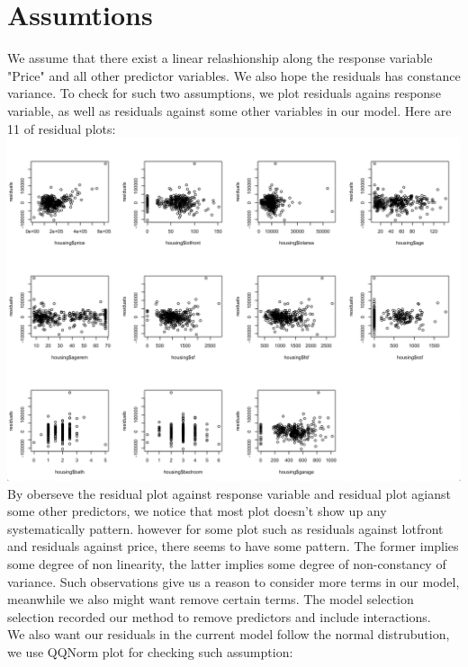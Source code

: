\documentclass{article}
\begin{document}
\section*{Assumtions}
We assume that there exist a linear relashionship along the response variable "Price" and all other predictor variables. We also hope the residuals has constance variance. To check for such two assumptions, we plot residuals agains response variable, as well as residuals against some other variables in our model. Here are 11 of residual plots: \\
\includegraphics[scale = 0.5]{residual_plot.png} \\
By oberseve the residual plot against response variable and residual plot agianst some other predictors, we notice that most plot doesn't show up any systematically pattern. however for some plot such as residuals against lotfront and residuals against price, there seems to have some pattern. The former implies some degree of non linearity, the latter implies some degree of non-constancy of variance. Such observations give us a reason to consider more terms in our model, meanwhile we also might want remove certain terms. The model selection selection recorded our method to remove predictors and include interactions.\\
We also want our residuals in the current model follow the normal distrubution, we use QQNorm plot for checking such assumption: \\
\end{document}
